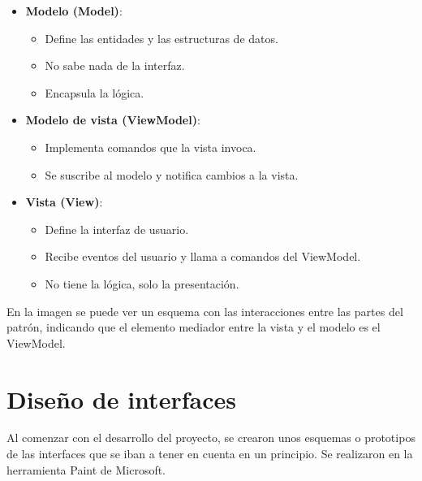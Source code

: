 \begin{itemize}
    \item
        \textbf{Modelo (Model)}:
        \begin{itemize}
            \item Define las entidades y las estructuras de datos.
            \item No sabe nada de la interfaz.
            \item Encapsula la lógica.
        \end{itemize}
    \item
        \textbf{Modelo de vista (ViewModel)}:
        \begin{itemize}
            \item Implementa comandos que la vista invoca.
            \item Se suscribe al modelo y notifica cambios a la vista.
        \end{itemize}
    \item
        \textbf{Vista (View)}:
        \begin{itemize}
            \item Define la interfaz de usuario.
            \item Recibe eventos del usuario y llama a comandos del ViewModel.
            \item No tiene la lógica, solo la presentación.
        \end{itemize}
\end{itemize}


En la imagen se puede ver un esquema con las interacciones entre las partes del patrón, indicando que el elemento mediador entre la vista y el modelo es el ViewModel.

\newpage

\section{Diseño de interfaces}

Al comenzar con el desarrollo del proyecto, se crearon unos esquemas o prototipos de las interfaces que se iban a tener en cuenta en un principio. Se realizaron en la herramienta Paint de Microsoft.




